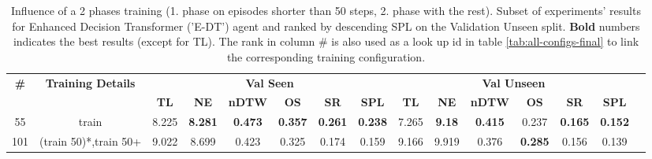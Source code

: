 \begin{table}
\centering
\caption{\label{tab:e_dt_split_training_50}Influence of a 2 phases training (1. phase on episodes shorter than 50 steps, 2. phase with the rest). Subset of experiments' results for Enhanced Decision Transformer ('E-DT') agent and ranked by descending SPL on the Validation Unseen split. \textbf{Bold} numbers indicates the best results (except for TL). The rank in column \# is also used as a look up id in table \ref{tab:all-configs-final} to link the corresponding training configuration.}
\begin{tabular}{@{\hskip3pt}c@{\hskip3pt}c@{\hskip3pt}c@{\hskip3pt}c@{\hskip3pt}c@{\hskip3pt}c@{\hskip3pt}c@{\hskip3pt}c@{\hskip3pt}c@{\hskip3pt}c@{\hskip3pt}c@{\hskip3pt}c@{\hskip3pt}c@{\hskip3pt}c@{\hskip3pt}c}
\toprule
                                  \textbf{\#} & \textbf{Training Details} & \multicolumn{6}{c}{\textbf{Val Seen}} & \multicolumn{6}{c}{\textbf{Val Unseen}} \\
\cmidrule(l){3-8}\cmidrule(l){9-14}\textbf{~} &                \textbf{~} &       \textbf{TL} &     \textbf{NE} &   \textbf{nDTW} &     \textbf{OS} &     \textbf{SR} &    \textbf{SPL} &         \textbf{TL} &    \textbf{NE} &   \textbf{nDTW} &     \textbf{OS} &     \textbf{SR} &    \textbf{SPL} \\
\midrule
                                           55 &                     train &             8.225 &  \textbf{8.281} &  \textbf{0.473} &  \textbf{0.357} &  \textbf{0.261} &  \textbf{0.238} &               7.265 &  \textbf{9.18} &  \textbf{0.415} &           0.237 &  \textbf{0.165} &  \textbf{0.152} \\
                                          101 &     (train 50)*,train 50+ &             9.022 &           8.699 &           0.423 &           0.325 &           0.174 &           0.159 &               9.166 &          9.919 &           0.376 &  \textbf{0.285} &           0.156 &           0.139 \\
\bottomrule
\end{tabular}
\end{table}
